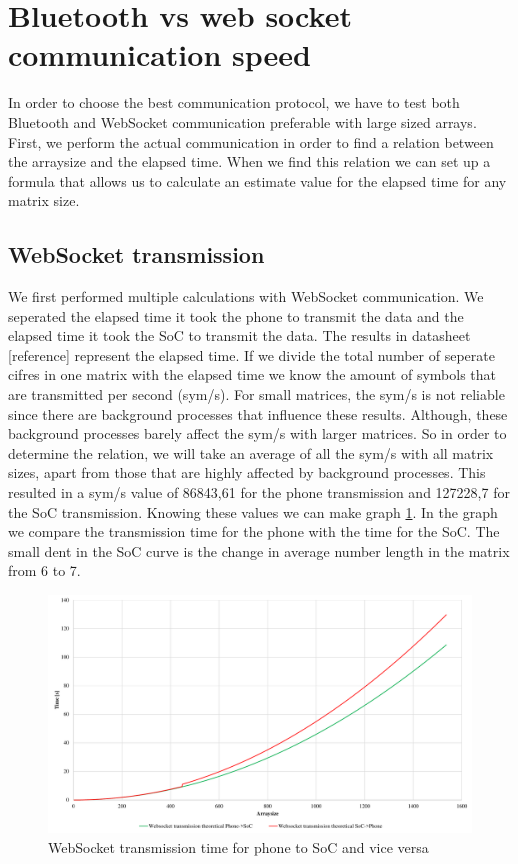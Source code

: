 \documentclass[a4paper, 11pt]{report}
\begin{document}
\section{Bluetooth vs web socket communication speed}
In order to choose the best communication protocol, we have to test both Bluetooth and WebSocket communication preferable with large sized arrays. First, we perform the actual communication in order to find a relation between the arraysize and the elapsed time. When we find this relation we can set up a formula that allows us to calculate an estimate value for the elapsed time for any matrix size.

	\subsection{WebSocket transmission}
We first performed multiple calculations with WebSocket communication. We seperated the elapsed time it took the phone to transmit the data and the elapsed time it took the SoC to transmit the data. The results in datasheet [reference] represent the elapsed time. If we divide the total number of seperate cifres in one matrix with the elapsed time we know the amount of symbols that are transmitted per second (sym/s). For small matrices, the sym/s is not reliable since there are background processes that influence these results. Although, these background processes barely affect the sym/s with larger matrices. So in order to determine the relation, we will take an average of all the sym/s with all matrix sizes, apart from those that are highly affected by background processes. This resulted in a sym/s value of 86843,61 for the phone transmission and 127228,7 for the SoC transmission. Knowing these values we can make graph \ref{graph:websocketTime}. In the graph we compare the transmission time for the phone with the time for the SoC. The small dent in 
the SoC curve is the change in average number length in the matrix from 6 to 7.
\begin{figure}[ht]
\centering
\includegraphics[scale=0.45]{images/WebsocketTransmissionSpeed.pdf}
\caption{WebSocket transmission time for phone to SoC and vice versa}\label{graph:websocketTime}
\end{figure}
\end{document}
